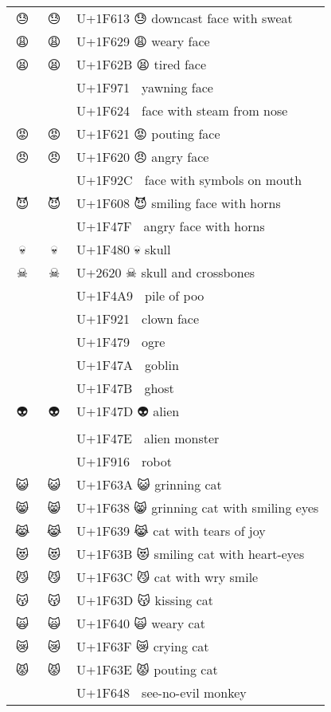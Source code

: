 \documentclass[a4paper,12pt]{ltjarticle}
\newcommand{\fontA}[1]{{\fontspec[RawFeature={mode=harf,dist,ccmp}]{Segoe UI Emoji} #1}}
\newcommand{\fontB}[1]{{\fontspec[RawFeature={mode=harf,dist,ccmp}]{Noto Color Emoji} #1}}
\begin{document}
\begin{longtable}[c]{ccp{0.8\linewidth}}
\fontA{😓}&\fontB{😓}&U+1F613 😓 downcast face with sweat\\
\fontA{😩}&\fontB{😩}&U+1F629 😩 weary face\\
\fontA{😫}&\fontB{😫}&U+1F62B 😫 tired face\\
\fontA{🥱}&\fontB{🥱}&U+1F971 🥱 yawning face\\
\fontA{😤}&\fontB{😤}&U+1F624 😤 face with steam from nose\\
\fontA{😡}&\fontB{😡}&U+1F621 😡 pouting face\\
\fontA{😠}&\fontB{😠}&U+1F620 😠 angry face\\
\fontA{🤬}&\fontB{🤬}&U+1F92C 🤬 face with symbols on mouth\\
\fontA{😈}&\fontB{😈}&U+1F608 😈 smiling face with horns\\
\fontA{👿}&\fontB{👿}&U+1F47F 👿 angry face with horns\\
\fontA{💀}&\fontB{💀}&U+1F480 💀 skull\\
\fontA{☠}&\fontB{☠}&U+2620 ☠ skull and crossbones\\
\fontA{💩}&\fontB{💩}&U+1F4A9 💩 pile of poo\\
\fontA{🤡}&\fontB{🤡}&U+1F921 🤡 clown face\\
\fontA{👹}&\fontB{👹}&U+1F479 👹 ogre\\
\fontA{👺}&\fontB{👺}&U+1F47A 👺 goblin\\
\fontA{👻}&\fontB{👻}&U+1F47B 👻 ghost\\
\fontA{👽}&\fontB{👽}&U+1F47D 👽 alien\\
\fontA{👾}&\fontB{👾}&U+1F47E 👾 alien monster\\
\fontA{🤖}&\fontB{🤖}&U+1F916 🤖 robot\\
\fontA{😺}&\fontB{😺}&U+1F63A 😺 grinning cat\\
\fontA{😸}&\fontB{😸}&U+1F638 😸 grinning cat with smiling eyes\\
\fontA{😹}&\fontB{😹}&U+1F639 😹 cat with tears of joy\\
\fontA{😻}&\fontB{😻}&U+1F63B 😻 smiling cat with heart-eyes\\
\fontA{😼}&\fontB{😼}&U+1F63C 😼 cat with wry smile\\
\fontA{😽}&\fontB{😽}&U+1F63D 😽 kissing cat\\
\fontA{🙀}&\fontB{🙀}&U+1F640 🙀 weary cat\\
\fontA{😿}&\fontB{😿}&U+1F63F 😿 crying cat\\
\fontA{😾}&\fontB{😾}&U+1F63E 😾 pouting cat\\
\fontA{🙈}&\fontB{🙈}&U+1F648 🙈 see-no-evil monkey\\

\end{longtable}
\end{document}
